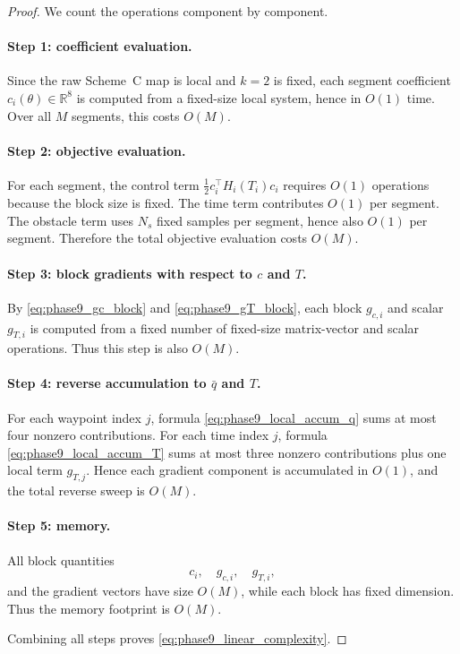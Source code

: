 \begin{proof}
We count the operations component by component.

\paragraph{Step 1: coefficient evaluation.}
Since the raw Scheme~C map is local and \(k=2\) is fixed, each segment coefficient \(c_i(\theta)\in\mathbb R^8\) is computed from a fixed-size local system, hence in \(O(1)\) time.
Over all \(M\) segments, this costs \(O(M)\).

\paragraph{Step 2: objective evaluation.}
For each segment, the control term \(\frac12 c_i^\top H_i(T_i)c_i\) requires \(O(1)\) operations because the block size is fixed.
The time term contributes \(O(1)\) per segment.
The obstacle term uses \(N_s\) fixed samples per segment, hence also \(O(1)\) per segment.
Therefore the total objective evaluation costs \(O(M)\).

\paragraph{Step 3: block gradients with respect to \(c\) and \(T\).}
By \eqref{eq:phase9_gc_block} and \eqref{eq:phase9_gT_block}, each block \(g_{c,i}\) and scalar \(g_{T,i}\) is computed from a fixed number of fixed-size matrix-vector and scalar operations.
Thus this step is also \(O(M)\).

\paragraph{Step 4: reverse accumulation to \(\bar q\) and \(T\).}
For each waypoint index \(j\), formula \eqref{eq:phase9_local_accum_q} sums at most four nonzero contributions.
For each time index \(j\), formula \eqref{eq:phase9_local_accum_T} sums at most three nonzero contributions plus one local term \(g_{T,j}\).
Hence each gradient component is accumulated in \(O(1)\), and the total reverse sweep is \(O(M)\).

\paragraph{Step 5: memory.}
All block quantities
\[
c_i,\quad g_{c,i},\quad g_{T,i},
\]
and the gradient vectors have size \(O(M)\), while each block has fixed dimension.
Thus the memory footprint is \(O(M)\).

Combining all steps proves \eqref{eq:phase9_linear_complexity}.
\end{proof}

